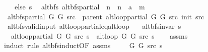 \begin{isabellebody}
\ \ \ \ else\ s{\isacharparenright}{\kern0pt}{\isachardoublequoteclose}\isanewline
\isanewline
{}\isamarkupfalse%
\ {\isacharparenleft}{\kern0pt}\ alt{\isacharunderscore}{\kern0pt}bfs{\isacharparenright}{\kern0pt}\ alt{\isacharunderscore}{\kern0pt}bfs{\isacharunderscore}{\kern0pt}partial\ {\isacharcolon}{\kern0pt}{\isacharcolon}{\kern0pt}\ {\isachardoublequoteopen}{\isacharprime}{\kern0pt}n\ {\isasymRightarrow}\ {\isacharprime}{\kern0pt}n\ {\isasymRightarrow}\ {\isacharprime}{\kern0pt}a\ {\isasymRightarrow}\ {\isacharprime}{\kern0pt}m{\isachardoublequoteclose}\ \isanewline
\ \ {\isachardoublequoteopen}alt{\isacharunderscore}{\kern0pt}bfs{\isacharunderscore}{\kern0pt}partial\ G{}\ G{}\ src\ {\isasymequiv}\ parent\ {\isacharparenleft}{\kern0pt}alt{\isacharunderscore}{\kern0pt}loop{\isacharunderscore}{\kern0pt}partial\ G{}\ G{}\ src\ {\isacharparenleft}{\kern0pt}init\ src{\isacharparenright}{\kern0pt}{\isacharparenright}{\kern0pt}{\isachardoublequoteclose}\isanewline
\isanewline
{}\isamarkupfalse%
\ {\isacharparenleft}{\kern0pt}\ alt{\isacharunderscore}{\kern0pt}bfs{\isacharunderscore}{\kern0pt}valid{\isacharunderscore}{\kern0pt}input{\isacharparenright}{\kern0pt}\ alt{\isacharunderscore}{\kern0pt}loop{\isacharunderscore}{\kern0pt}partial{\isacharunderscore}{\kern0pt}eq{\isacharunderscore}{\kern0pt}alt{\isacharunderscore}{\kern0pt}loop{\isacharcolon}{\kern0pt}\isanewline
\ \ \ {\isachardoublequoteopen}alt{\isacharunderscore}{\kern0pt}bfs{\isacharunderscore}{\kern0pt}invar{\isacharprime}{\kern0pt}{\isacharprime}{\kern0pt}\ s{\isachardoublequoteclose}\isanewline
\ \ \ {\isachardoublequoteopen}alt{\isacharunderscore}{\kern0pt}loop{\isacharunderscore}{\kern0pt}partial\ G{}\ G{}\ src\ s\ {\isacharequal}{\kern0pt}\ alt{\isacharunderscore}{\kern0pt}loop\ G{}\ G{}\ src\ s{\isachardoublequoteclose}\isanewline
%
\isadelimproof
\ \ %
\endisadelimproof
%
\isatagproof
{}\isamarkupfalse%
\ assms\isanewline
{}\isamarkupfalse%
\ {\isacharparenleft}{\kern0pt}induct\ rule{\isacharcolon}{\kern0pt}\ alt{\isacharunderscore}{\kern0pt}bfs{\isacharunderscore}{\kern0pt}induct{\isacharbrackleft}{\kern0pt}OF\ assms{\isacharbrackright}{\kern0pt}{\isacharparenright}{\kern0pt}\isanewline
\ \ \isamarkupfalse%
\ {\isacharparenleft}{\kern0pt}{}\ G{}\ G{}\ src\ s{\isacharparenright}{\kern0pt}\isanewline

\end{isabellebody}

